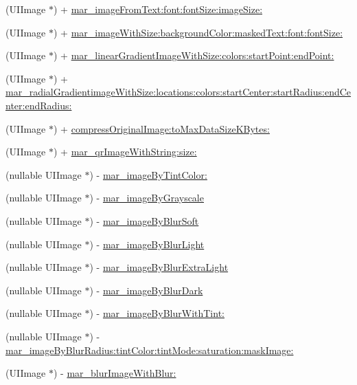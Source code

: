  \begin{DoxyCompactItemize}
\item 
(U\+I\+Image $\ast$) + \hyperlink{category_u_i_image_07_m_a_r_e_x_08_aafc593e85b8cc2eacc790428c99f8be2}{mar\+\_\+image\+From\+Text\+:font\+:font\+Size\+:image\+Size\+:}
\item 
(U\+I\+Image $\ast$) + \hyperlink{category_u_i_image_07_m_a_r_e_x_08_a47bb40f3c82b65f3cb6301cdff272f7d}{mar\+\_\+image\+With\+Size\+:background\+Color\+:masked\+Text\+:font\+:font\+Size\+:}
\item 
(U\+I\+Image $\ast$) + \hyperlink{category_u_i_image_07_m_a_r_e_x_08_a678b5b9fdfd2c26b9f4d3af3ceeb6c0b}{mar\+\_\+linear\+Gradient\+Image\+With\+Size\+:colors\+:start\+Point\+:end\+Point\+:}
\item 
(U\+I\+Image $\ast$) + \hyperlink{category_u_i_image_07_m_a_r_e_x_08_a953dbf4e34a225103783cf0ef61dbb23}{mar\+\_\+radial\+Gradientimage\+With\+Size\+:locations\+:colors\+:start\+Center\+:start\+Radius\+:end\+Center\+:end\+Radius\+:}
\item 
(U\+I\+Image $\ast$) + \hyperlink{category_u_i_image_07_m_a_r_e_x_08_a4660f3e3caa8fe6412f068377c3b889a}{compress\+Original\+Image\+:to\+Max\+Data\+Size\+K\+Bytes\+:}
\item 
(U\+I\+Image $\ast$) + \hyperlink{category_u_i_image_07_m_a_r_e_x_08_ac78d68da74fd3007b9d75d325d46ca2d}{mar\+\_\+qr\+Image\+With\+String\+:size\+:}
\item 
(nullable U\+I\+Image $\ast$) -\/ \hyperlink{category_u_i_image_07_m_a_r_e_x_08_a10b4a447eb28ea75cfbf6bad92257003}{mar\+\_\+image\+By\+Tint\+Color\+:}
\item 
(nullable U\+I\+Image $\ast$) -\/ \hyperlink{category_u_i_image_07_m_a_r_e_x_08_a774293723ff3db07673de0f8ac7f3baa}{mar\+\_\+image\+By\+Grayscale}
\item 
(nullable U\+I\+Image $\ast$) -\/ \hyperlink{category_u_i_image_07_m_a_r_e_x_08_a837582dae41150c92b517078a195c255}{mar\+\_\+image\+By\+Blur\+Soft}
\item 
(nullable U\+I\+Image $\ast$) -\/ \hyperlink{category_u_i_image_07_m_a_r_e_x_08_a179b7a155c9abe2bc3e9129180dc6e52}{mar\+\_\+image\+By\+Blur\+Light}
\item 
(nullable U\+I\+Image $\ast$) -\/ \hyperlink{category_u_i_image_07_m_a_r_e_x_08_aa35229f84b7a10970a6094ba59660dd7}{mar\+\_\+image\+By\+Blur\+Extra\+Light}
\item 
(nullable U\+I\+Image $\ast$) -\/ \hyperlink{category_u_i_image_07_m_a_r_e_x_08_ab68df1119dd1bab21193ff7d8c2a5658}{mar\+\_\+image\+By\+Blur\+Dark}
\item 
(nullable U\+I\+Image $\ast$) -\/ \hyperlink{category_u_i_image_07_m_a_r_e_x_08_a041c786e4f4bad06b9e6495d1ca66897}{mar\+\_\+image\+By\+Blur\+With\+Tint\+:}
\item 
(nullable U\+I\+Image $\ast$) -\/ \hyperlink{category_u_i_image_07_m_a_r_e_x_08_aa079614cf36142dec53faca9418c0df0}{mar\+\_\+image\+By\+Blur\+Radius\+:tint\+Color\+:tint\+Mode\+:saturation\+:mask\+Image\+:}
\item 
(U\+I\+Image $\ast$) -\/ \hyperlink{category_u_i_image_07_m_a_r_e_x_08_a61c030eb16308e1c9bdc83a33ee90eb6}{mar\+\_\+blur\+Image\+With\+Blur\+:}
\end{DoxyCompactItemize}


